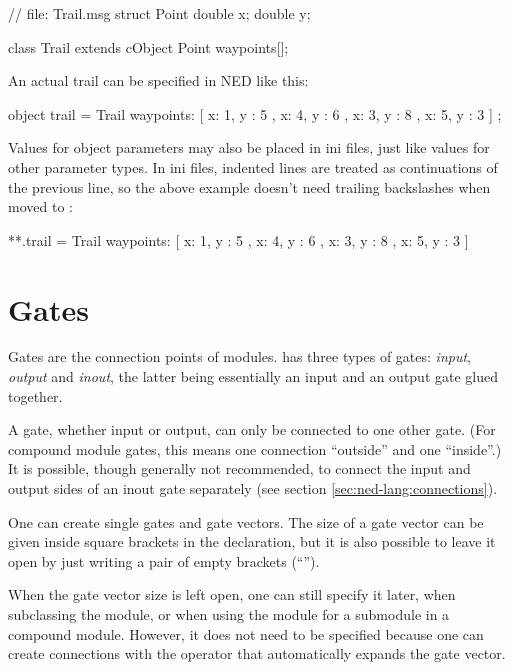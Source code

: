 \begin{msg}
// file: Trail.msg
struct Point {
    double x;
    double y;
}

class Trail extends cObject {
    Point waypoints[];
}
\end{msg}

An actual trail can be specified in NED like this:

\begin{ned}
object trail = Trail {
    waypoints: [
        { x: 1, y : 5 },
        { x: 4, y : 6 },
        { x: 3, y : 8 },
        { x: 5, y : 3 }
    ]
  };
\end{ned}

Values for object parameters may also be placed in ini files, just like values
for other parameter types. In ini files, indented lines are treated as
continuations of the previous line, so the above example doesn't need trailing
backslashes when moved to :

\begin{inifile}
**.trail = Trail {
        waypoints: [
            { x: 1, y : 5 },
            { x: 4, y : 6 },
            { x: 3, y : 8 },
            { x: 5, y : 3 }
        ]
      }
\end{inifile}


\section{Gates}
\label{sec:ned-lang:gates}

Gates are the connection points of modules.  {\opp} has three types of
gates: \textit{input}, \textit{output} and \textit{inout}, the latter being
essentially an input and an output gate glued together.

A gate, whether input or output, can only be connected to one other
gate. (For compound module gates, this means one connection ``outside'' and
one ``inside''.)  It is possible, though generally not recommended, to
connect the input and output sides of an inout gate separately (see section
\ref{sec:ned-lang:connections}).

One can create single gates and gate vectors. The size of a gate vector
can be given inside square brackets in the declaration, but it is also possible
to leave it open by just writing a pair of empty brackets (``\ttt{[]}'').

When the gate vector size is left open, one can still specify it later,
when subclassing the module, or when using the module for a submodule in a
compound module. However, it does not need to be specified because
one can create connections with the  operator that
automatically expands the gate vector.

